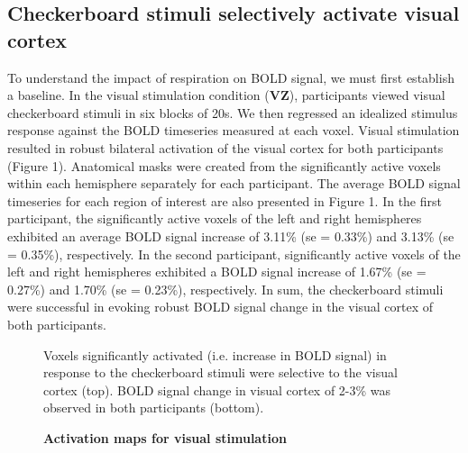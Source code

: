\documentclass[9pt]{NEU502b-fmri}
\begin{document}
\subsection{Checkerboard stimuli selectively activate visual cortex}
To understand the impact of respiration on BOLD signal, we must first establish a baseline. In the visual stimulation condition (\textbf{VZ}), participants viewed visual checkerboard stimuli in six blocks of 20s. We then regressed an idealized stimulus response against the BOLD timeseries measured at each voxel. Visual stimulation resulted in robust bilateral activation of the visual cortex for both participants (Figure 1). Anatomical masks were created from the significantly active voxels within each hemisphere separately for each participant. The average BOLD signal timeseries for each region of interest are also presented in Figure 1. In the first participant, the significantly active voxels of the left and right hemispheres exhibited an average BOLD signal increase  of 3.11\% (se = 0.33\%) and 3.13\% (se = 0.35\%), respectively. In the second participant, significantly active voxels of the left and right hemispheres exhibited a BOLD signal increase of 1.67\% (se = 0.27\%) and 1.70\% (se = 0.23\%), respectively. In sum, the checkerboard stimuli were successful in evoking robust BOLD signal change in the visual cortex of both participants. 

\begin{figure}
\centerline{%
%
}
\caption{\textbf{Activation maps for visual stimulation}}
\par Voxels significantly activated (i.e. increase in BOLD signal) in response to the checkerboard stimuli were selective to the visual cortex (top). BOLD signal change in visual cortex of 2-3\% was observed in both participants (bottom). 
\end{figure}
\end{document}

